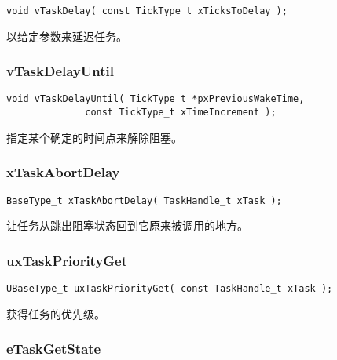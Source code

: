 \documentclass[12pt, a4paper]{article}
\begin{document}
\begin{lstlisting}[language={[ANSI]C},keywordstyle=\color{blue!70},commentstyle=\color{red!50!green!50!blue!50},frame=shadowbox, rulesepcolor=\color{red!20!green!20!blue!20}]
void vTaskDelay( const TickType_t xTicksToDelay );
\end{lstlisting}

以给定参数来延迟任务。

\subsubsection {vTaskDelayUntil}

\begin{lstlisting}[language={[ANSI]C},keywordstyle=\color{blue!70},commentstyle=\color{red!50!green!50!blue!50},frame=shadowbox, rulesepcolor=\color{red!20!green!20!blue!20}]
void vTaskDelayUntil( TickType_t *pxPreviousWakeTime, 
		      const TickType_t xTimeIncrement );
\end{lstlisting}

指定某个确定的时间点来解除阻塞。

\subsubsection {xTaskAbortDelay}

\begin{lstlisting}[language={[ANSI]C},keywordstyle=\color{blue!70},commentstyle=\color{red!50!green!50!blue!50},frame=shadowbox, rulesepcolor=\color{red!20!green!20!blue!20}]
BaseType_t xTaskAbortDelay( TaskHandle_t xTask );
\end{lstlisting}

让任务从跳出阻塞状态回到它原来被调用的地方。

\subsubsection {uxTaskPriorityGet}

\begin{lstlisting}[language={[ANSI]C},keywordstyle=\color{blue!70},commentstyle=\color{red!50!green!50!blue!50},frame=shadowbox, rulesepcolor=\color{red!20!green!20!blue!20}]
UBaseType_t uxTaskPriorityGet( const TaskHandle_t xTask );
\end{lstlisting}

获得任务的优先级。

\subsubsection {eTaskGetState}
\end{document}
